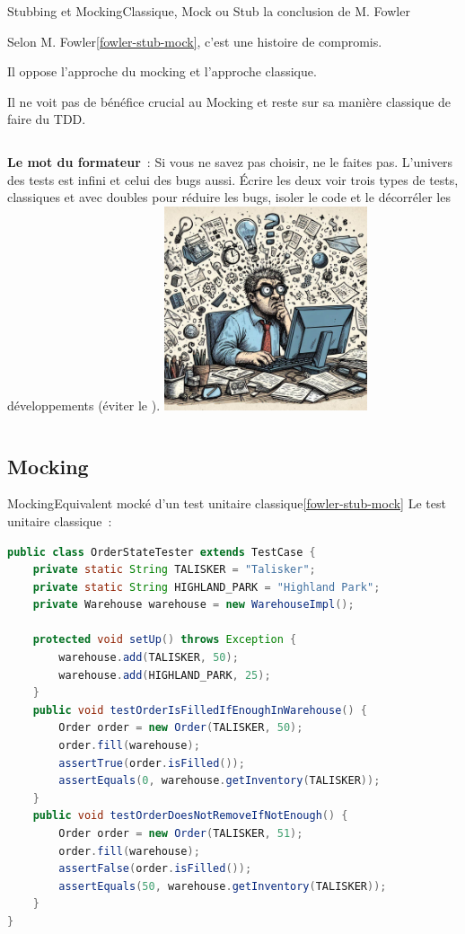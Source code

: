 \documentclass{beamer}
\begin{document}
    \begin{frame}{Stubbing et Mocking}{Classique, Mock ou Stub la conclusion de M. Fowler}

        Selon M. Fowler\cref{fowler-stub-mock}, c'est une histoire de compromis.

        Il oppose l'approche du mocking et l'approche classique.

        Il ne voit pas de bénéfice crucial au Mocking et reste sur sa manière classique de faire du TDD.
        \begin{columns}
            \textbf{Le mot du formateur}~: Si vous ne savez pas choisir, ne le faites pas.
            L'univers des tests est infini et celui des bugs aussi.
            Écrire les deux voir trois types de tests, classiques et avec doubles pour réduire les bugs, isoler le code et le décorréler les développements (éviter le ).
            \centering
            \includegraphics[width=6cm]{image/guy-overthinking}
        \end{columns}
    \end{frame}

    \subsection{Mocking}\label{subsec:mock}
    \begin{frame}[fragile]{Mocking}{Equivalent mocké d'un test unitaire classique\cref{fowler-stub-mock}}
        Le test unitaire classique~:
        \begin{lstlisting}[language=Java,basicstyle=\ttfamily\tiny]
public class OrderStateTester extends TestCase {
    private static String TALISKER = "Talisker";
    private static String HIGHLAND_PARK = "Highland Park";
    private Warehouse warehouse = new WarehouseImpl();

    protected void setUp() throws Exception {
        warehouse.add(TALISKER, 50);
        warehouse.add(HIGHLAND_PARK, 25);
    }
    public void testOrderIsFilledIfEnoughInWarehouse() {
        Order order = new Order(TALISKER, 50);
        order.fill(warehouse);
        assertTrue(order.isFilled());
        assertEquals(0, warehouse.getInventory(TALISKER));
    }
    public void testOrderDoesNotRemoveIfNotEnough() {
        Order order = new Order(TALISKER, 51);
        order.fill(warehouse);
        assertFalse(order.isFilled());
        assertEquals(50, warehouse.getInventory(TALISKER));
    }
}
        \end{lstlisting}
    \end{frame}
\end{document}
